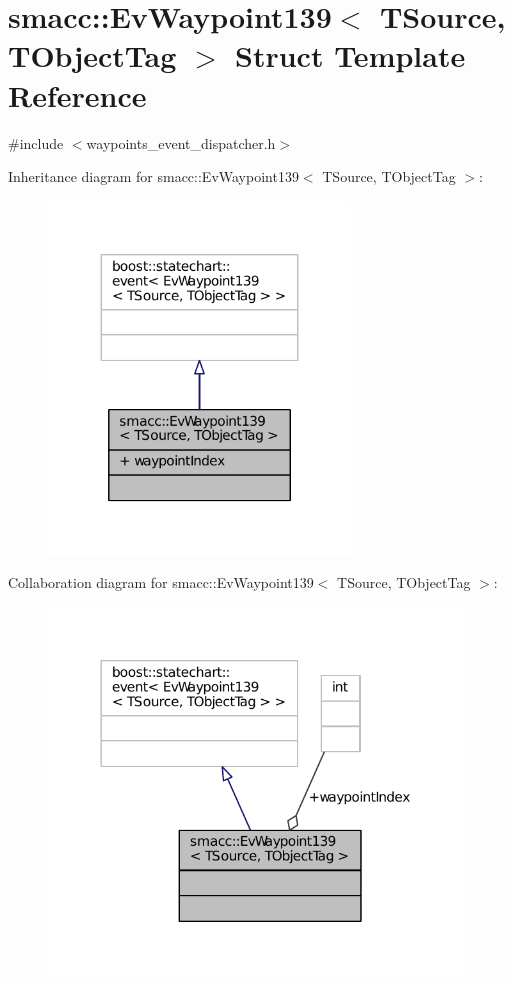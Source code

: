 \hypertarget{structsmacc_1_1EvWaypoint139}{}\section{smacc\+:\+:Ev\+Waypoint139$<$ T\+Source, T\+Object\+Tag $>$ Struct Template Reference}
\label{structsmacc_1_1EvWaypoint139}


{\ttfamily \#include $<$waypoints\+\_\+event\+\_\+dispatcher.\+h$>$}



Inheritance diagram for smacc\+:\+:Ev\+Waypoint139$<$ T\+Source, T\+Object\+Tag $>$\+:
\nopagebreak
\begin{figure}[H]
\begin{center}
\leavevmode
\includegraphics[width=227pt]{structsmacc_1_1EvWaypoint139__inherit__graph}
\end{center}
\end{figure}


Collaboration diagram for smacc\+:\+:Ev\+Waypoint139$<$ T\+Source, T\+Object\+Tag $>$\+:
\nopagebreak
\begin{figure}[H]
\begin{center}
\leavevmode
\includegraphics[width=312pt]{structsmacc_1_1EvWaypoint139__coll__graph}
\end{center}
\end{figure}
